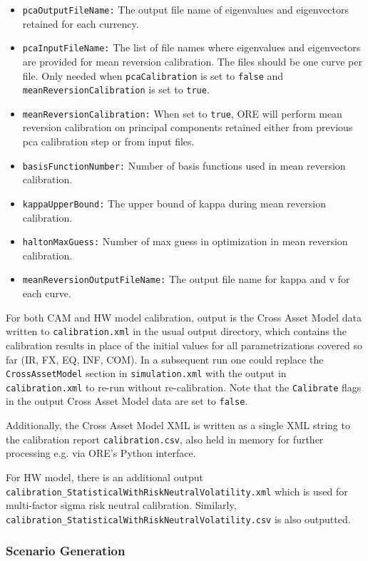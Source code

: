 \begin{itemize}
\item {\tt pcaOutputFileName:} The output file name of eigenvalues and eigenvectors retained for each currency.
\item {\tt pcaInputFileName:} The list of file names where eigenvalues and eigenvectors are provided for mean reversion calibration. The files should be one curve per file. Only needed when {\tt pcaCalibration} is set to {\tt false} and {\tt meanReversionCalibration} is set to {\tt true}.
\item {\tt meanReversionCalibration:} When set to {\tt true}, ORE will perform mean reversion calibration on principal components retained either from previous pca calibration step or from input files.
\item {\tt basisFunctionNumber:} Number of basis functions used in mean reversion calibration.
\item {\tt kappaUpperBound:} The upper bound of kappa during mean reversion calibration.
\item {\tt haltonMaxGuess:} Number of max guess in optimization in mean reversion calibration.
\item {\tt meanReversionOutputFileName:} The output file name for kappa and v for each curve.
\end{itemize}

For both CAM and HW model calibration, output is the Cross Asset Model data written to {\tt calibration.xml} in the usual output directory, which contains the calibration
results in place of the initial values for all parametrizations covered so far (IR, FX, EQ, INF, COM). In a subsequent run one could replace
the {\tt CrossAssetModel} section in {\tt simulation.xml} with the output in {\tt calibration.xml} to re-run without re-calibration.
Note that the {\tt Calibrate} flags in the output Cross Asset Model data are set to {\tt false}.

Additionally, the Cross Asset Model XML is written as a single XML string to the calibration report {\tt calibration.csv}, also held in
memory for further processing e.g. via ORE's Python interface.

For HW model, there is an additional output {\tt calibration\_StatisticalWithRiskNeutralVolatility.xml} which is used for multi-factor sigma risk neutral calibration. Similarly, {\tt calibration\_StatisticalWithRiskNeutralVolatility.csv} is also outputted.


\subsubsection{Scenario Generation}

